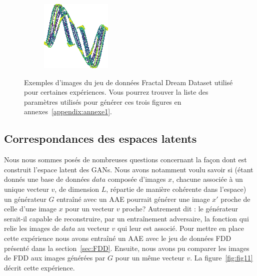 \documentclass[11pt,francais]{article}
\begin{document}
\begin{figure}[h!]
\begin{subfigure}[b]{0.20\textwidth}
    \end{subfigure}
    \begin{subfigure}[b]{0.20\textwidth}
        \includegraphics[width=\textwidth]{Figures/FDD/-0,9333646250089_-0,3698044331245828_-1,9514116449042127_-0,376713271698188_-1,1759178511809651_-1,7157801385982319.png}
    \end{subfigure}
    \caption{Exemples d'images du jeu de données Fractal Dream Dataset utilisé pour certaines expériences. Vous pourrez trouver la liste des paramètres utilisés pour générer ces trois figures en annexes~\ref{appendix:annexe1}.}
    \label{fig:fig2}
\end{figure}

\subsection{Correspondances des espaces latents}
\label{sec:CorrespondancesLS}
Nous nous sommes posés de nombreuses questions concernant la façon dont est construit l'espace latent des GANs. 
Nous avons notamment voulu savoir si (étant donnés une base de données \(data\) composée d'images \(x\), chacune associée à un unique vecteur \(v\), de dimension \(L\), répartie de manière cohérente dans l'espace) un générateur \(G\) entraîné avec un AAE pourrait générer une image \(x'\) proche de celle d'une image \(x\) pour un vecteur \(v\) proche? Autrement dit : le générateur serait-il capable de reconstruire, par un entraînement adversaire, la fonction qui relie les images de \(data\) au vecteur \(v\) qui leur est associé. Pour mettre en place cette expérience nous avons entraîné un AAE avec le jeu de données FDD présenté dans la section~\ref{sec:FDD}. Ensuite, nous avons pu comparer les images de FDD aux images générées par \(G\) pour un même vecteur \(v\). La figure~\ref{fig:fig11} décrit cette expérience.
\end{document}
